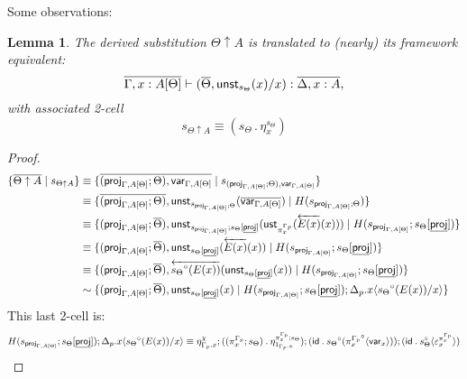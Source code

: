 \documentclass[10pt]{article}
\newtheorem{lemma}{Lemma}
\theoremstyle{definition}
\newcommand{\yields}{\vdash}
\newcommand{\rewrite}[2]{\overleftarrow{#1}(#2)}
\newcommand\UStI[2]{\ensuremath{\mathsf{ust}_{#1}(#2)}}
\newcommand\UnSt[2]{\ensuremath{\mathsf{unst}_{#1}(#2)}}
\newcommand\TrCirc[2]{\ensuremath{{#1}^\circ(#2)}}
\newcommand\proj[1]{\ensuremath{\mathsf{proj}_{#1}}}
\newcommand\var[1]{\ensuremath{\mathsf{var}_{#1}}}
\newcommand{\id}{\mathsf{id}}
\newcommand\ap[2]{\ensuremath{#1 \langle #2 \rangle }}
\newcommand\bdot[0]{\mathbin{.}}
\begin{document}
Some observations:
\begin{lemma}
The derived substitution $\Theta \uparrow A$ is translated to (nearly) its framework equivalent: \[\upstairs{\Gamma, x : A[\Theta]} \yields (\upstairs{\Theta}, \UnSt{ s_{\Theta}}{x}/x) : \upstairs{\Delta, x : A},\]
with associated 2-cell \[s_{\Theta \uparrow A} \equiv (s_\Theta \bdot \eta^{s_\Theta}_x)\]
\end{lemma}
\begin{proof}
\begin{align*}
\{ \upstairs{\Theta \uparrow A} \mid s_{\Theta \uparrow A} \}
&\equiv \{\upstairs{(\proj{\Gamma, A[\Theta]}; \Theta) , \var{\Gamma, A[\Theta]}} \mid s_{(\proj{\Gamma, A[\Theta]}; \Theta) , \var{\Gamma, A[\Theta]}} \}\\
&\equiv \{ \upstairs{(\proj{\Gamma, A[\Theta]}; \Theta)} , \UnSt{s_{\proj{\Gamma, A[\Theta]}; \Theta}}{\upstairs{\var{\Gamma, A[\Theta]}}} \mid H(s_{\proj{\Gamma, A[\Theta]}; \Theta}) \} \\
&\equiv \{ (\proj{\Gamma, A[\Theta]};  \upstairs{\Theta}) , \UnSt{s_{\proj{\Gamma, A[\Theta]}} ; s_{\Theta}[\downstairs{\mathsf{proj}}]}{\UStI{\pi^{\asdep{\Gamma}}_x}{\rewrite{E(x)}{x}}} \mid H(s_{\proj{\Gamma, A[\Theta]}};s_\Theta[\downstairs{\mathsf{proj}}]) \}\\
&\equiv \{ (\proj{\Gamma, A[\Theta]};  \upstairs{\Theta}) , \UnSt{ s_{\Theta}[\downstairs{\mathsf{proj}}]}{\rewrite{E(x)}{x}} \mid H(s_{\proj{\Gamma, A[\Theta]}};s_\Theta[\downstairs{\mathsf{proj}}]) \}\\
&\equiv \{ (\proj{\Gamma, A[\Theta]};  \upstairs{\Theta}) , \rewrite{\TrCirc{s_\Theta}{E(x)}}{\UnSt{ s_{\Theta}[\downstairs{\mathsf{proj}}]}{x}} \mid H(s_{\proj{\Gamma, A[\Theta]}};s_\Theta[\downstairs{\mathsf{proj}}]) \}\\
&\sim \{ (\proj{\Gamma, A[\Theta]};  \upstairs{\Theta}) , \UnSt{ s_{\Theta}[\downstairs{\mathsf{proj}}]}{x} \mid H(s_{\proj{\Gamma, A[\Theta]}};s_\Theta[\downstairs{\mathsf{proj}}]) ; \ap{\asdep{\Delta}.x}{\TrCirc{s_\Theta}{E(x)}/x} \}
\end{align*}
This last 2-cell is:
\begin{align*}
H(s_{\proj{\Gamma, A[\Theta]}};s_\Theta[\downstairs{\mathsf{proj}}]) ; \ap{\asdep{\Delta}.x}{\TrCirc{s_\Theta}{E(x)}/x} 
&\equiv \eta^\chi_{\asdep{\Gamma}.x} ; ((\pi^{\asdep{\Gamma}}_x;s_\Theta) \bdot \eta^{\pi^{\asdep{\Gamma}}_x;s_\Theta}_{1_{\asdep{\Gamma}.x}}) ; (\id \bdot \TrCirc{s_\Theta}{\ap{{\pi^{\asdep{\Gamma}}_x}^\circ}{\var{x}}}) ; (\id \bdot \ap{s_\Theta^\circ}{\varepsilon^{\pi^{\asdep{\Gamma}}_x}_x}) \\

\end{align*}
\end{proof}
\end{document}
